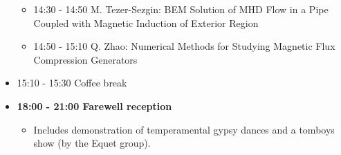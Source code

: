 \documentclass[10pt, A4]{article}%
\begin{document}
\begin{itemize}
\begin{itemize}
    \item 14:30 - 14:50 M. Tezer-Sezgin: BEM Solution of MHD Flow in a Pipe Coupled with Magnetic Induction of Exterior Region 
    \item 14:50 - 15:10 Q. Zhao: Numerical Methods for Studying Magnetic Flux Compression Generators 
  \end{itemize}
  \item 15:10 - 15:30 Coffee break
  \item {\bf 18:00 - 21:00 Farewell reception}
    \begin{itemize}
     \item Includes demonstration of temperamental gypsy dances and a tomboys show (by the Equet group).  
  \end{itemize} 
\end{itemize}

\newpage
\end{document}
